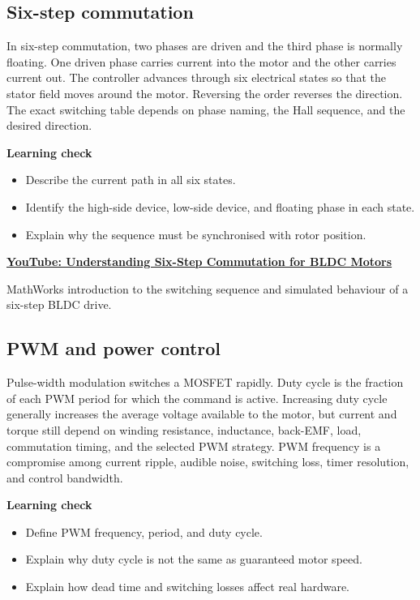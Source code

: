 \documentclass[11pt,a4paper]{article}
\newcommand{\Resource}[3]{%
  \begin{resourcebox}
    \href{#2}{\textbf{\color{DARESTeal}#1}}\par
    {\small #3}
  \end{resourcebox}
}
\begin{document}
\subsection{Six-step commutation}

In six-step commutation, two phases are driven and the third phase is normally
floating. One driven phase carries current into the motor and the other
carries current out. The controller advances through six electrical states
so that the stator field moves around the motor. Reversing the order reverses
the direction. The exact switching table depends on phase naming, the Hall
sequence, and the desired direction.

\textbf{Learning check}
\begin{itemize}
  \item Describe the current path in all six states.
  \item Identify the high-side device, low-side device, and floating phase in each state.
  \item Explain why the sequence must be synchronised with rotor position.
\end{itemize}

\Resource
  {YouTube: Understanding Six-Step Commutation for BLDC Motors}
  {https://www.youtube.com/watch?v=WYJWdMV3YMs}
  {MathWorks introduction to the switching sequence and simulated behaviour of a six-step BLDC drive.}

\subsection{PWM and power control}

Pulse-width modulation switches a MOSFET rapidly. Duty cycle is the fraction
of each PWM period for which the command is active. Increasing duty cycle
generally increases the average voltage available to the motor, but current
and torque still depend on winding resistance, inductance, back-EMF, load,
commutation timing, and the selected PWM strategy. PWM frequency is a
compromise among current ripple, audible noise, switching loss, timer
resolution, and control bandwidth.

\textbf{Learning check}
\begin{itemize}
  \item Define PWM frequency, period, and duty cycle.
  \item Explain why duty cycle is not the same as guaranteed motor speed.
  \item Explain how dead time and switching losses affect real hardware.
\end{itemize}
\end{document}
